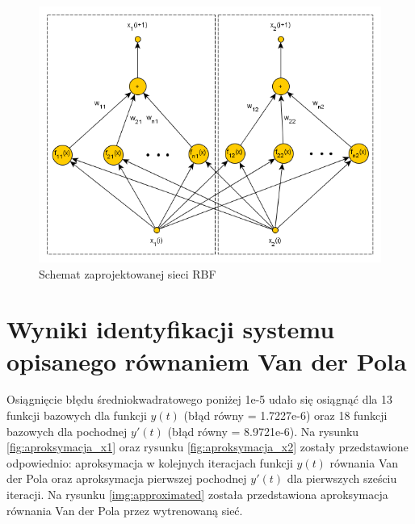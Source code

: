 \begin{figure}[ht!]
	\centering
	
	\includegraphics[width = \textwidth]{images/rbf.png}
	\caption{Schemat zaprojektowanej sieci RBF}
	\label{fig:rbf}	

\end{figure}


\clearpage
\section{Wyniki identyfikacji systemu opisanego równaniem Van der Pola}

Osiągnięcie błędu średniokwadratowego poniżej 1e-5 udało się osiągnąć dla 13 funkcji bazowych dla funkcji $y(t)$ (błąd równy = 1.7227e-6) oraz 18 funkcji bazowych dla pochodnej $y'(t)$ (błąd równy = 8.9721e-6). Na rysunku \ref{fig:aproksymacja_x1} oraz rysunku \ref{fig:aproksymacja_x2} zostały przedstawione odpowiednio: aproksymacja w kolejnych iteracjach funkcji $y(t)$ równania Van der Pola oraz aproksymacja pierwszej pochodnej $y'(t)$ dla pierwszych sześciu iteracji. Na rysunku \ref{img:approximated} została przedstawiona aproksymacja równania Van der Pola przez wytrenowaną sieć.

